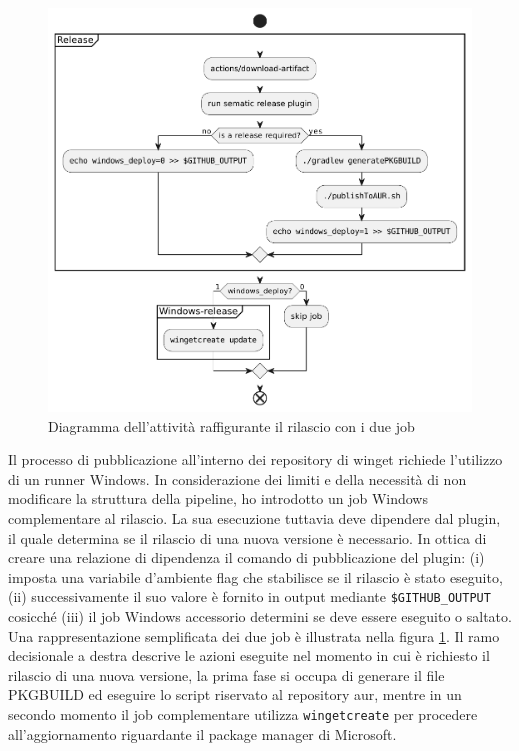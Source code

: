 \begin{figure}[htb]
	\centering
	\includegraphics[width=.95\linewidth]{figures/release-flow.pdf}
	\caption{Diagramma dell'attività raffigurante il rilascio con i due job}
	\label{fig:release-flow}
\end{figure}

Il processo di pubblicazione all'interno dei repository di winget richiede l'utilizzo di un runner Windows. In considerazione dei limiti e della necessità di non modificare la struttura della pipeline, ho introdotto un job Windows complementare al rilascio. La sua esecuzione tuttavia deve dipendere dal plugin, il quale determina se il rilascio di una nuova versione è necessario. In ottica di creare una relazione di dipendenza il comando di pubblicazione del plugin: (i) imposta una variabile d'ambiente flag che stabilisce se il rilascio è stato eseguito, (ii) successivamente il suo valore è fornito in output mediante \texttt{\$GITHUB\_OUTPUT} cosicché (iii) il job Windows accessorio determini se deve essere eseguito o saltato. Una rappresentazione semplificata dei due job è illustrata nella figura \ref{fig:release-flow}. Il ramo decisionale a destra descrive le azioni eseguite nel momento in cui è richiesto il rilascio di una nuova versione, la prima fase si occupa di generare il file PKGBUILD ed eseguire lo script riservato al repository \ac{aur}, mentre in un secondo momento il job complementare utilizza \texttt{wingetcreate} per procedere all'aggiornamento riguardante il package manager di Microsoft.

